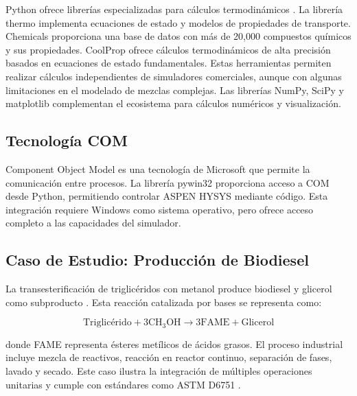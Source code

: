 \documentclass{syx7}
\begin{document}
Python ofrece librerías especializadas para cálculos termodinámicos \cite{python2023}. La librería thermo \cite{thermo2023} implementa ecuaciones de estado y modelos de propiedades de transporte. Chemicals \cite{chemicals2023} proporciona una base de datos con más de 20,000 compuestos químicos y sus propiedades. CoolProp \cite{bell2016coolprop} ofrece cálculos termodinámicos de alta precisión basados en ecuaciones de estado fundamentales. Estas herramientas permiten realizar cálculos independientes de simuladores comerciales, aunque con algunas limitaciones en el modelado de mezclas complejas. Las librerías NumPy, SciPy \cite{virtanen2020scipy} y matplotlib \cite{hunter2007matplotlib} complementan el ecosistema para cálculos numéricos y visualización.

\subsection{Tecnología COM}

Component Object Model es una tecnología de Microsoft que permite la comunicación entre procesos. La librería pywin32 proporciona acceso a COM desde Python, permitiendo controlar ASPEN HYSYS mediante código. Esta integración requiere Windows como sistema operativo, pero ofrece acceso completo a las capacidades del simulador.

\subsection{Caso de Estudio: Producción de Biodiesel}

La transesterificación de triglicéridos con metanol produce biodiesel y glicerol como subproducto \cite{tapanes2008transesterification,demirbas2009biodiesel}. Esta reacción catalizada por bases se representa como:

\begin{equation}
\text{Triglicérido} + 3\text{CH}_3\text{OH} \rightarrow 3\text{FAME} + \text{Glicerol}
\label{eq:transesterificacion}
\end{equation}

donde FAME representa ésteres metílicos de ácidos grasos. El proceso industrial incluye mezcla de reactivos, reacción en reactor continuo, separación de fases, lavado y secado. Este caso ilustra la integración de múltiples operaciones unitarias y cumple con estándares como ASTM D6751 \cite{astm2020biodiesel}.

\end{document}
